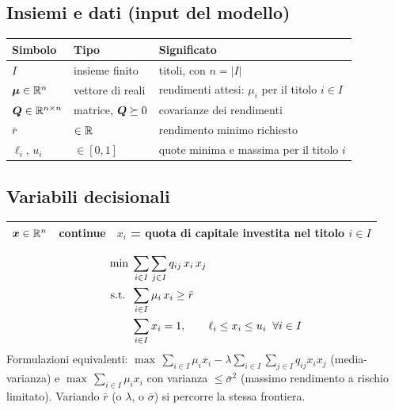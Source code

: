 \subsection*{Insiemi e dati (input del modello)}
\begin{center}\small
\begin{tabular}{llp{7.2cm}}
\toprule
Simbolo & Tipo & Significato \\
\midrule
$I$ & insieme finito & titoli, con $n = |I|$ \\
$\boldsymbol\mu \in \mathbb{R}^n$ & vettore di reali & rendimenti attesi: $\mu_i$ per il titolo $i \in I$ \\
$\boldsymbol{Q} \in \mathbb{R}^{n \times n}$ & matrice, $\boldsymbol{Q} \succeq 0$ & covarianze dei rendimenti \\
$\bar r$ & $\in \mathbb{R}$ & rendimento minimo richiesto \\
$\ell_i,\, u_i$ & $\in [0, 1]$ & quote minima e massima per il titolo $i$ \\
\bottomrule
\end{tabular}
\end{center}

\subsection*{Variabili decisionali}
\begin{center}\small
\begin{tabular}{llp{7.2cm}}
\toprule
$\boldsymbol{x} \in \mathbb{R}^n$ & continue & $x_i$ = quota di capitale investita nel titolo $i \in I$ \\
\bottomrule
\end{tabular}
\end{center}

\begin{modello}
\begin{align}
\min\;& \sum_{i \in I}\sum_{j \in I} q_{ij}\, x_i\, x_j \notag\\
\text{s.t.}\;\; & \sum_{i \in I} \mu_i\, x_i \ge \bar r \label{eq:rendmin}\\
& \sum_{i \in I} x_i = 1, \qquad \ell_i \le x_i \le u_i \;\;\forall i \in I \label{eq:budget6}
\end{align}
Formulazioni equivalenti: $\max\, \sum_{i \in I} \mu_i x_i - \lambda \sum_{i \in I}\sum_{j \in I} q_{ij} x_i x_j$
(media-varianza) e $\max\, \sum_{i \in I} \mu_i x_i$ con varianza $\le \bar\sigma^2$
(massimo rendimento a rischio limitato).
Variando $\bar r$ (o $\lambda$, o $\bar\sigma$) si percorre la stessa frontiera.
\end{modello}

